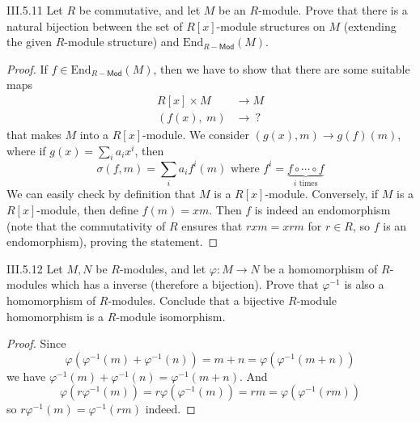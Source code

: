 \begin{problem}{III.5.11}
Let $R$ be commutative, and let $M$ be an $R$-module. Prove that there is a natural bijection between the set of $R[x]$-module structures on $M$ (extending the given $R$-module structure) and $\text{End}_{R-\mathsf{Mod}}(M)$.
\end{problem}
\begin{proof}
If $f \in \text{End}_{R-\textsf{Mod}}(M)$, then we have to show that there are some suitable maps
\begin{align*}
R[x] \times M &\to M \\
(f(x), \:m) &\to \: ?
\end{align*}
that makes $M$ into a $R[x]$-module. We consider $(g(x),m) \to g(f)(m)$, where if $g(x) = \sum_i a_i x^i$, then
\[
\sigma(f,m) = \sum_{i} a_i f^i(m) \text{ where } f^i = \underbrace{f \circ \cdots \circ f}_{i\text{ times}}
\]
We can easily check by definition that $M$ is a $R[x]$-module. Conversely, if $M$ is a $R[x]$-module, then define $f(m) = xm$. Then $f$ is indeed an endomorphism (note that the commutativity of $R$ ensures that $rxm = xrm$ for $r \in R$, so $f$ is an endomorphism), proving the statement.
\end{proof}

\begin{problem}{III.5.12}
Let $M,N$ be $R$-modules, and let $\varphi:M \to N$ be a homomorphism of $R$-modules which has a inverse (therefore a bijection). Prove that $\varphi^{-1}$ is also a homomorphism of $R$-modules. Conclude that a bijective $R$-module homomorphism is a $R$-module isomorphism.
\end{problem}
\begin{proof}
Since
\[
\varphi(\varphi^{-1}(m) + \varphi^{-1}(n)) = m + n = \varphi(\varphi^{-1}(m + n))
\]
we have $\varphi^{-1}(m) + \varphi^{-1}(n) = \varphi^{-1}(m + n)$. And
\[
\varphi(r\varphi^{-1}(m)) = r\varphi(\varphi^{-1}(m)) = rm = \varphi(\varphi^{-1}(rm))
\]
so $r\varphi^{-1}(m) = \varphi^{-1}(rm)$ indeed.
\end{proof}


